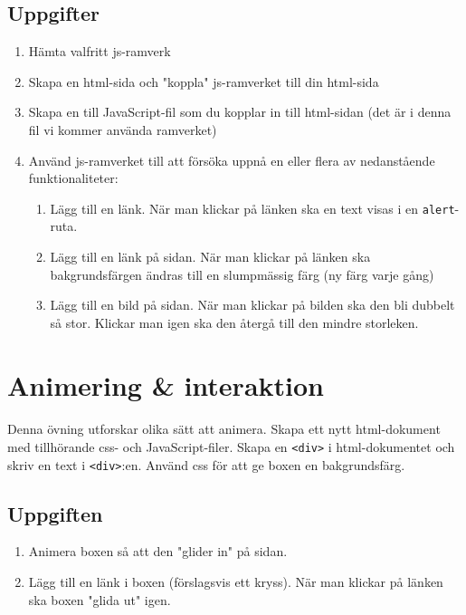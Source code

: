\documentclass{article}
\begin{document}
    \subsection*{Uppgifter}
      \begin{enumerate}
        \item Hämta valfritt js-ramverk
        \item Skapa en html-sida och "koppla" js-ramverket till din html-sida
        \item Skapa en till JavaScript-fil som du kopplar in till html-sidan (det är i denna fil vi kommer använda ramverket)
        \item Använd js-ramverket till att försöka uppnå en eller flera av nedanstående funktionaliteter:
          \begin{enumerate}
            \item Lägg till en länk. När man klickar på länken ska en text visas i en \texttt{alert}-ruta.
            \item Lägg till en länk på sidan. När man klickar på länken ska bakgrundsfärgen ändras till en slumpmässig färg (ny färg varje gång)
            \item Lägg till en bild på sidan. När man klickar på bilden ska den bli dubbelt så stor. Klickar man igen ska den återgå till den mindre storleken.
          \end{enumerate}
      \end{enumerate}



  \newpage
  \section{ Animering \& interaktion }
    \paragraph{}
    Denna övning utforskar olika sätt att animera. Skapa ett nytt html-dokument med tillhörande css- och JavaScript-filer. Skapa en \texttt{<div>} i html-dokumentet och skriv en text i \texttt{<div>}:en. Använd css för att ge boxen en bakgrundsfärg.

    \subsection*{Uppgiften}
      \begin{enumerate}
        \item Animera boxen så att den "glider in" på sidan.
        \item Lägg till en länk i boxen (förslagsvis ett kryss). När man klickar på länken ska boxen "glida ut" igen.
      \end{enumerate}
\end{document}
